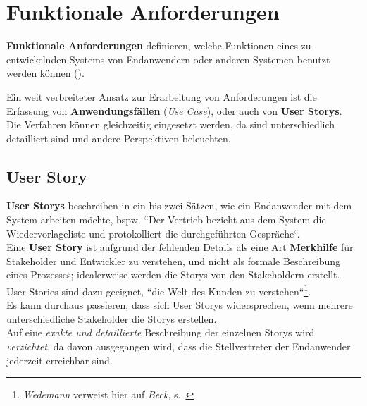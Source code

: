 \section{Funktionale Anforderungen}

\vspace{5mm}
\begin{tcolorbox}
    \textbf{Funktionale Anforderungen} definieren, welche Funktionen eines zu entwickelnden Systems von Endanwendern oder anderen Systemen benutzt werden können (\cite[66]{Wed09}).
\end{tcolorbox}
\vspace{5mm}

\noindent
Ein weit verbreiteter Ansatz zur Erarbeitung von Anforderungen ist die Erfassung von \textbf{Anwendungsfällen} (\textit{Use Case}), oder auch von \textbf{User Storys}.\\

\noindent
Die Verfahren können gleichzeitig eingesetzt werden, da sind unterschiedlich detailliert sind und andere Perspektiven beleuchten.

\subsection{User Story}

\textbf{User Storys} beschreiben in ein bis zwei Sätzen, wie ein Endanwender mit dem System arbeiten möchte, bspw. ``Der Vertrieb bezieht aus dem System die Wiedervorlageliste und protokolliert die durchgeführten Gespräche``.\\

\noindent
Eine \textbf{User Story} ist aufgrund der fehlenden Details als eine Art \textbf{Merkhilfe} für Stakeholder und Entwickler zu verstehen, und nicht als formale Beschreibung eines Prozesses; idealerweise werden die Storys von den Stakeholdern erstellt.\\

\noindent
User Stories sind dazu geeignet, ``die Welt des Kunden zu verstehen``\footnote{
\textit{Wedemann} verweist hier auf \textit{Beck}, s.~\cite[66]{Wed09}
}.\\
Es kann durchaus passieren, dass sich User Storys widersprechen, wenn mehrere unterschiedliche Stakeholder die Storys erstellen.\\

\noindent
Auf eine \textit{exakte und detaillierte} Beschreibung der einzelnen Storys wird \textit{verzichtet}, da davon ausgegangen wird, dass die Stellvertreter der Endanwender jederzeit erreichbar sind.

